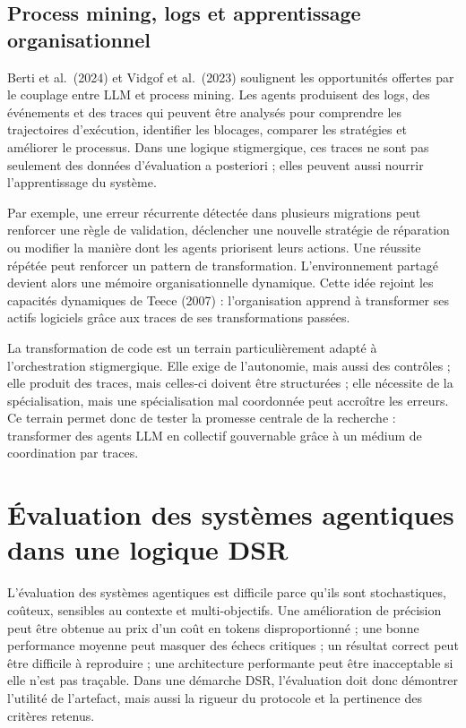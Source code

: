 \subsection{Process mining, logs et apprentissage organisationnel}\label{process-mining-logs-et-apprentissage-organisationnel}

Berti et al.~(2024) et Vidgof et al.~(2023) soulignent les opportunités offertes par le couplage entre LLM et process mining. Les agents produisent des logs, des événements et des traces qui peuvent être analysés pour comprendre les trajectoires d'exécution, identifier les blocages, comparer les stratégies et améliorer le processus. Dans une logique stigmergique, ces traces ne sont pas seulement des données d'évaluation a posteriori ; elles peuvent aussi nourrir l'apprentissage du système.

Par exemple, une erreur récurrente détectée dans plusieurs migrations peut renforcer une règle de validation, déclencher une nouvelle stratégie de réparation ou modifier la manière dont les agents priorisent leurs actions. Une réussite répétée peut renforcer un pattern de transformation. L'environnement partagé devient alors une mémoire organisationnelle dynamique. Cette idée rejoint les capacités dynamiques de Teece (2007) : l'organisation apprend à transformer ses actifs logiciels grâce aux traces de ses transformations passées.



La transformation de code est un terrain particulièrement adapté à l'orchestration stigmergique. Elle exige de l'autonomie, mais aussi des contrôles ; elle produit des traces, mais celles-ci doivent être structurées ; elle nécessite de la spécialisation, mais une spécialisation mal coordonnée peut accroître les erreurs. Ce terrain permet donc de tester la promesse centrale de la recherche : transformer des agents LLM en collectif gouvernable grâce à un médium de coordination par traces.
\section{Évaluation des systèmes agentiques dans une logique DSR}\label{sec:rev-evaluation}

L'évaluation des systèmes agentiques est difficile parce qu'ils sont stochastiques, coûteux, sensibles au contexte et multi-objectifs. Une amélioration de précision peut être obtenue au prix d'un coût en tokens disproportionné ; une bonne performance moyenne peut masquer des échecs critiques ; un résultat correct peut être difficile à reproduire ; une architecture performante peut être inacceptable si elle n'est pas traçable. Dans une démarche DSR, l'évaluation doit donc démontrer l'utilité de l'artefact, mais aussi la rigueur du protocole et la pertinence des critères retenus.

